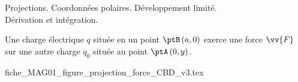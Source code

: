 \begin{prerequis}
	Projections. Coordonnées polaires. Développement limité. \\
	Dérivation et intégration.
\end{prerequis}










\hauteurLargeurCadreReponse		{8mm}{4cm}
\initialisationEntrainement


Une charge électrique $q$ située en un point $\ptB\left(a,0\right)$ exerce une force $\vv{F}$ sur une autre charge $q_0$ située au point $\ptA\left( 0,y \right)$.
\begin{center}
	{fiche_MAG01_figure_projection_force_CBD_v3.tex}
\end{center}


\debutEntrainement



